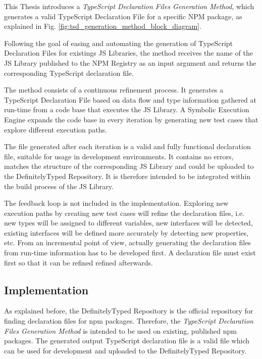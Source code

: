 This Thesis introduces a \textit{TypeScript Declaration Files Generation Method}, which generates a valid TypeScript Declaration File for a specific NPM package, as explained in Fig. \ref{fig:tsd_generation_method_block_diagram}.



Following the goal of easing and automating the generation of TypeScript Declaration Files for existings JS Libraries, the method receives the name of the JS Library published to the NPM Registry as an input argument and returns the corresponding TypeScript declaration file.

The method consists of a continuous refinement process. It generates a TypeScript Declaration File based on data flow and type information gathered at run-time from a code base that executes the JS Library. A Symbolic Execution Engine expands the code base in every iteration by generating new test cases that explore different execution paths.

The file generated after each iteration is a valid and fully functional declaration file, suitable for usage in development environments. It contains no errors, matches the structure of the corresponding JS Library and could be uploaded to the DefinitelyTyped Repository. It is therefore intended to be integrated within the build process of the JS Library.

The feedback loop is not included in the implementation. Exploring new execution paths by creating new test cases will refine the declaration files, i.e. new types will be assigned to different variables, new interfaces will be detected, existing interfaces will be defined more accurately by detecting new properties, etc. From an incremental point of view, actually generating the declaration files from run-time information has to be developed first. A declaration file must exist first so that it can be refined refined afterwards. 




\subsection{Implementation}
As explained before, the DefinitelyTyped Repository is the official repository for finding declaration files for npm packages. Therefore, the \textit{TypeScript Declaration Files Generation Method} is intended to be used on existing, published npm packages. The generated output TypeScript declaration file is a valid file which can be used for development and uploaded to the DefinitelyTyped Repository.

